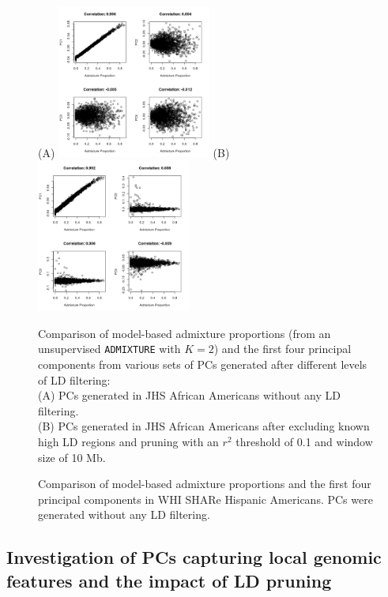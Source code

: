 \documentclass[12pt]{article}
\newcommand{\edit}[1]{{\color{red}{#1}}}
\begin{document}
\begin{figure}[h]
\center
(A)
\includegraphics[width=0.45\textwidth]{figs/pcsvsglob/JHS_pcsvsglob_prune_FALSE_1_0_0.01_K2k1}
(B)
\includegraphics[width=0.45\textwidth]{figs/pcsvsglob/JHS_pcsvsglob_prune_TRUE_0.1_10_0.01_K2k1}
\caption{Comparison of model-based admixture proportions (from an unsupervised \texttt{ADMIXTURE} with $K = 2$) and the first four principal components from various sets of PCs generated after different levels of LD filtering: \\ (A) PCs generated in JHS African Americans without any LD filtering. \\ (B) PCs generated in JHS African Americans after excluding known high LD regions and pruning with an $r^2$ threshold of 0.1 and window size of 10 Mb. \edit{--- NEEDS UPDATING PER DIRECTIONS ABOVE}}
\label{fig:pcsvsglobAA}
\end{figure}

\begin{figure}
\caption{Comparison of model-based admixture proportions and the first four principal components in WHI SHARe Hispanic Americans. PCs were generated without any LD filtering.}
\label{fig:pcsvsglobHA}
\end{figure}

\subsection{Investigation of PCs capturing local genomic features and the impact of LD pruning} 
\label{sec:CorrPlots}
\end{document}
